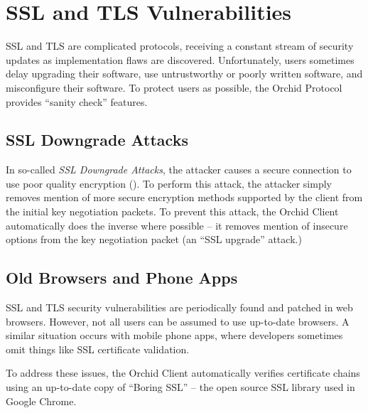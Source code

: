 \documentclass{article}
\newcommand{\orchid}{Orchid}
\newcommand{\Orchid}{\orchid}
\begin{document}
\section{SSL and TLS Vulnerabilities}

SSL and TLS are complicated protocols, receiving a constant stream of
security updates as implementation flaws are discovered.
Unfortunately, users sometimes delay upgrading their software, use
untrustworthy or poorly written software, and misconfigure their
software. To protect users as possible, the \Orchid{} Protocol provides
``sanity check'' features.

\subsection{SSL Downgrade Attacks}

In so-called \emph{SSL Downgrade Attacks}, the attacker causes a
secure connection to use poor quality encryption
(\cite{ssl-downgrade}). To perform this attack, the attacker simply
removes mention of more secure encryption methods supported by the
client from the initial key negotiation packets. To prevent this
attack, the \Orchid{} Client automatically does the inverse where
possible -- it removes mention of insecure options from the key
negotiation packet (an ``SSL upgrade'' attack.)

\subsection{Old Browsers and Phone Apps}

SSL and TLS security vulnerabilities are periodically found and
patched in web browsers. However, not all users can be assumed to use
up-to-date browsers. A similar situation occurs with mobile phone
apps, where developers sometimes omit things like SSL certificate
validation.

To address these issues, the \Orchid{} Client automatically verifies
certificate chains using an up-to-date copy of ``Boring SSL'' -- the
open source SSL library used in Google Chrome.



\end{document}
